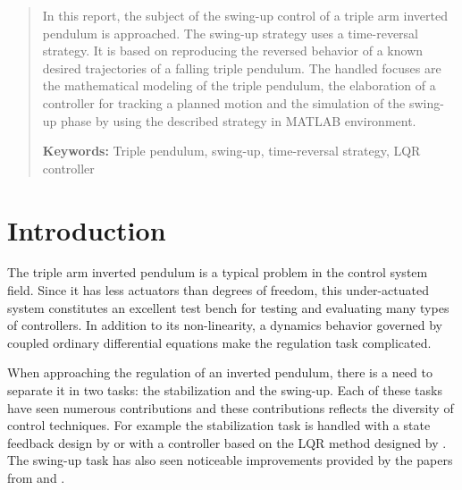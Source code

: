 \documentclass[a4paper,12pt]{article}
\begin{document}
\renewcommand{\headheight}{14.5pt}
\renewcommand{\tablename}{TABLE}
\renewcommand{\figurename}{FIGURE}

\hypersetup{pageanchor=false}

% 
\hypersetup{pageanchor=true}
\newpage


\begin{abstract}
In this report, the subject of the swing-up control of a triple arm inverted pendulum is approached. The swing-up strategy uses a time-reversal strategy. It is based on reproducing the reversed behavior of a known desired trajectories of a falling triple pendulum. The handled focuses are the mathematical modeling of the triple pendulum, the elaboration of a controller for tracking a planned motion and the simulation of the swing-up phase by using the described strategy in MATLAB environment.

\noindent
\textbf{Keywords: }Triple pendulum, swing-up, time-reversal strategy, LQR controller
\end{abstract}
\newpage
\thispagestyle{empty}
\tableofcontents
\newpage




\section{Introduction}\label{sec:intro} %
The triple arm inverted pendulum is a typical problem in the control system field. Since it has less actuators than degrees of freedom, this under-actuated system constitutes an excellent test bench for testing and evaluating many types of controllers. In addition to its non-linearity, a dynamics behavior governed by coupled ordinary differential equations make the regulation task complicated.

When approaching the regulation of an inverted pendulum, there is a need to separate it in two tasks: the stabilization and the swing-up. Each of these tasks have seen numerous contributions and these contributions reflects the diversity of control techniques. For example the stabilization task is handled with a state feedback design by \citet{Medrano1997} or with a controller based on the LQR method designed by \citet{Gupta2014}. The swing-up task has also seen noticeable improvements provided by the papers from \citet{Astrom2000287} and \citet{Gluck2013801}.
\end{document}
